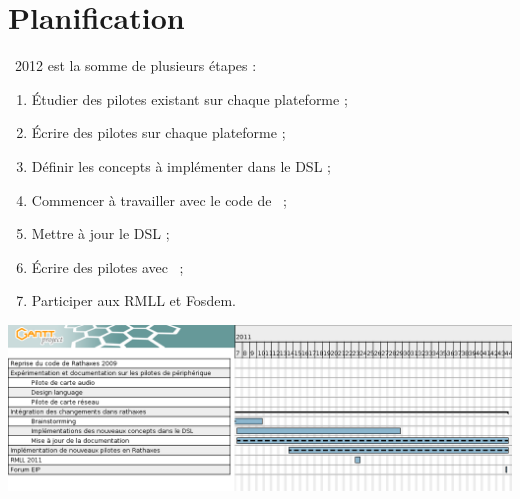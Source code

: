 \documentclass[chapterprefix=off]{rtxreport}
\begin{document}
\section{Planification}

\rtx\ 2012 est la somme de plusieurs étapes :

\begin{enumerate}
\item Étudier des pilotes existant sur chaque plateforme ;
\item Écrire des pilotes sur chaque plateforme ;
\item Définir les concepts à implémenter dans le DSL ;
\item Commencer \`a travailler avec le code de \rtx\ ;
\item Mettre \`a jour le DSL ;
\item Écrire des pilotes avec \rtx\ ;
\item Participer aux RMLL et Fosdem.
\end{enumerate}

\begin{landscape}
\begin{table}
\centering
{}
\includegraphics[scale=0.55]{../../gantt/ganttRathaxes_v2}
\end{table}
\end{landscape}

\rtxbibliography
\end{document}
